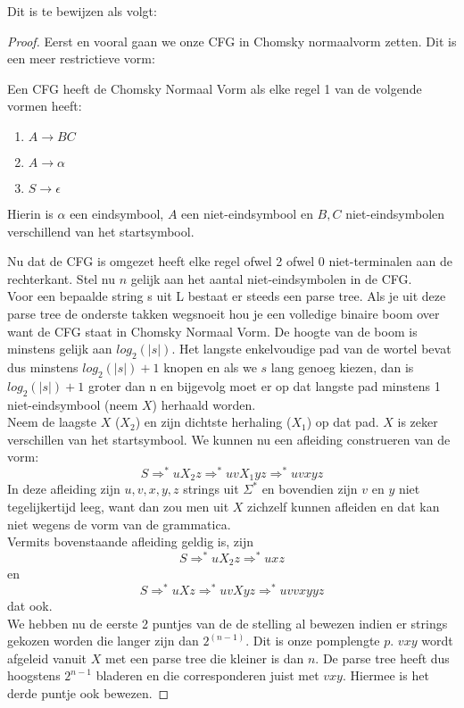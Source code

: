 Dit is te bewijzen als volgt:
\begin{proof}
Eerst en vooral gaan we onze CFG in Chomsky normaalvorm zetten. Dit is een meer restrictieve vorm:
\begin{theorem}
Een CFG heeft de Chomsky Normaal Vorm als elke regel 1 van de volgende vormen heeft:
\begin{enumerate}
\item $A \rightarrow BC$
\item $A \rightarrow \alpha$
\item $S \rightarrow \epsilon$
\end{enumerate}
Hierin is $\alpha$ een eindsymbool, $A$ een niet-eindsymbool en $B,C$ niet-eindsymbolen verschillend van het startsymbool.
\end{theorem}
Nu dat de CFG is omgezet heeft elke regel ofwel 2 ofwel 0 niet-terminalen aan de rechterkant. Stel nu $n$ gelijk aan het aantal niet-eindsymbolen in de CFG.\\[0.5cm]

Voor een bepaalde string s uit L bestaat er steeds een parse tree. Als je uit deze parse tree de onderste takken wegsnoeit hou je een volledige binaire boom over want de CFG staat in Chomsky Normaal Vorm. De hoogte van de boom is minstens gelijk aan $log_2(|s|)$. Het langste enkelvoudige pad van de wortel bevat dus minstens $log_2(|s|)+1$ knopen en als we $s$ lang genoeg kiezen, dan is $log_2(|s|)+1$ groter dan n en bijgevolg moet er op dat langste pad minstens 1 niet-eindsymbool (neem $X$) herhaald worden.\\[0.5cm]

Neem de laagste $X$ ($X_2$) en zijn dichtste herhaling ($X_1$) op dat pad. $X$ is zeker verschillen van het startsymbool. We kunnen nu een afleiding construeren van de vorm:
$$ S \Rightarrow^* u X_2 z \Rightarrow^* u v X_1 y z \Rightarrow^* uvxyz  $$
In deze afleiding zijn $u,v,x,y,z$ strings uit $\Sigma^*$ en bovendien zijn $v$ en $y$ niet tegelijkertijd leeg, want dan zou men uit $X$ zichzelf kunnen afleiden en dat kan niet wegens de vorm van de grammatica. \\[0.5cm]

Vermits bovenstaande afleiding geldig is, zijn
$$ S \Rightarrow^* u X_2 z \Rightarrow^* u x z  $$
en
$$ S \Rightarrow^* u X z \Rightarrow^* u v X y z \Rightarrow^* u v v x y y z  $$
dat ook. \\[0.5cm]

We hebben nu de eerste 2 puntjes van de de stelling al bewezen indien er strings gekozen worden die langer zijn dan $2^{(n-1)}$. Dit is onze pomplengte $p$. $vxy$ wordt afgeleid vanuit $X$ met een parse tree die kleiner is dan $n$. De parse tree heeft dus hoogstens $2^{n-1}$ bladeren en die corresponderen juist met $vxy$. Hiermee is het derde puntje ook bewezen.

\end{proof}

